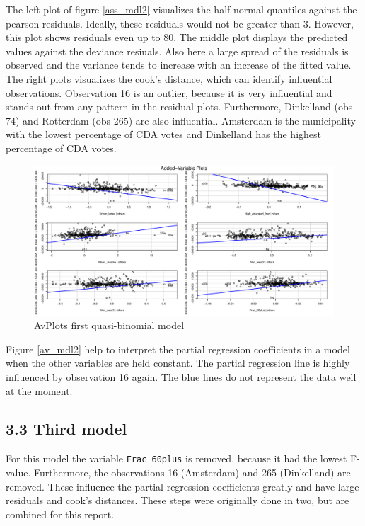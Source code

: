 \documentclass[11pt,]{article}
\begin{document}
The left plot of figure \ref{ass_mdl2} visualizes the half-normal
quantiles against the pearson residuals. Ideally, these residuals would
not be greater than 3. However, this plot shows residuals even up to 80.
The middle plot displays the predicted values against the deviance
resiuals. Also here a large spread of the residuals is observed and the
variance tends to increase with an increase of the fitted value. The
right plots visualizes the cook's distance, which can identify
influential observations. Observation 16 is an outlier, because it is
very influential and stands out from any pattern in the residual plots.
Furthermore, Dinkelland (obs 74) and Rotterdam (obs 265) are also
influential. Amsterdam is the municipality with the lowest percentage of
CDA votes and Dinkelland has the highest percentage of CDA votes.

\begin{figure}[H]

{\centering \includegraphics{Report_files/figure-latex/unnamed-chunk-16-1} 

}

\caption{\label{av_mdl2}AvPlots first quasi-binomial model}\label{fig:unnamed-chunk-16}
\end{figure}

Figure \ref{av_mdl2} help to interpret the partial regression
coefficients in a model when the other variables are held constant. The
partial regression line is highly influenced by observation 16 again.
The blue lines do not represent the data well at the moment.

\subsection{3.3 Third model}\label{third-model}

For this model the variable \texttt{Frac\_60plus} is removed, because it
had the lowest F-value. Furthermore, the observations 16 (Amsterdam) and
265 (Dinkelland) are removed. These influence the partial regression
coefficients greatly and have large residuals and cook's distances.
These steps were originally done in two, but are combined for this
report.
\end{document}
